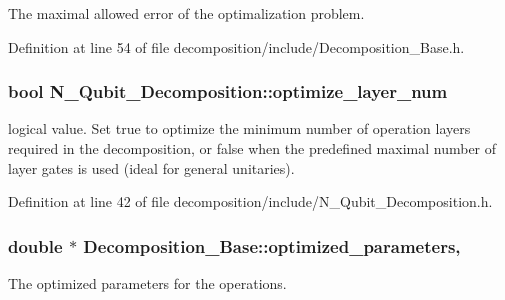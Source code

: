 The maximal allowed error of the optimalization problem. 



Definition at line 54 of file decomposition/include/\+Decomposition\+\_\+\+Base.\+h.

\subsubsection[{\texorpdfstring{optimize\+\_\+layer\+\_\+num}{optimize_layer_num}}]{\setlength{\rightskip}{0pt plus 5cm}bool N\+\_\+\+Qubit\+\_\+\+Decomposition\+::optimize\+\_\+layer\+\_\+num\hspace{0.3cm}{\ttfamily [protected]}}\hypertarget{class_n___qubit___decomposition_aad88308faf408e7b270b0853841a5fd0}{}\label{class_n___qubit___decomposition_aad88308faf408e7b270b0853841a5fd0}


logical value. Set true to optimize the minimum number of operation layers required in the decomposition, or false when the predefined maximal number of layer gates is used (ideal for general unitaries). 



Definition at line 42 of file decomposition/include/\+N\+\_\+\+Qubit\+\_\+\+Decomposition.\+h.

\subsubsection[{\texorpdfstring{optimized\+\_\+parameters}{optimized_parameters}}]{\setlength{\rightskip}{0pt plus 5cm}double $\ast$ Decomposition\+\_\+\+Base\+::optimized\+\_\+parameters\hspace{0.3cm}{\ttfamily [protected]}, {\ttfamily [inherited]}}\hypertarget{class_decomposition___base_a38bb2fae99a99736eaafbf9741eb2f5d}{}\label{class_decomposition___base_a38bb2fae99a99736eaafbf9741eb2f5d}


The optimized parameters for the operations. 



